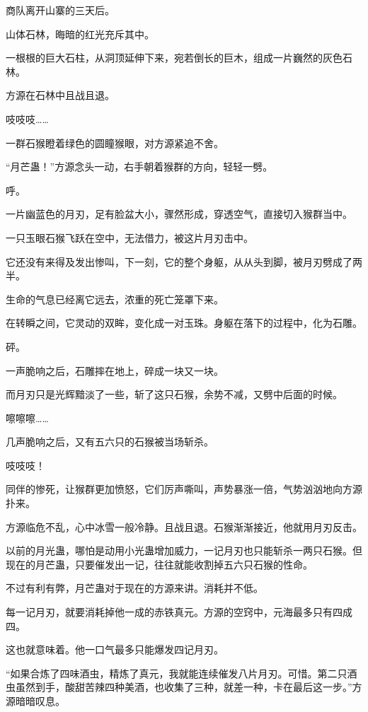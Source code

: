 
\begin{this_body}

商队离开山寨的三天后。

山体石林，晦暗的红光充斥其中。

一根根的巨大石柱，从洞顶延伸下来，宛若倒长的巨木，组成一片巍然的灰色石林。

方源在石林中且战且退。

吱吱吱……

一群石猴瞪着绿色的圆瞳猴眼，对方源紧追不舍。

“月芒蛊！”方源念头一动，右手朝着猴群的方向，轻轻一劈。

呼。

一片幽蓝色的月刃，足有脸盆大小，骤然形成，穿透空气，直接切入猴群当中。

一只玉眼石猴飞跃在空中，无法借力，被这片月刃击中。

它还没有来得及发出惨叫，下一刻，它的整个身躯，从从头到脚，被月刃劈成了两半。

生命的气息已经离它远去，浓重的死亡笼罩下来。

在转瞬之间，它灵动的双眸，变化成一对玉珠。身躯在落下的过程中，化为石雕。

砰。

一声脆响之后，石雕摔在地上，碎成一块又一块。

而月刃只是光辉黯淡了一些，斩了这只石猴，余势不减，又劈中后面的时候。

嚓嚓嚓……

几声脆响之后，又有五六只的石猴被当场斩杀。

吱吱吱！

同伴的惨死，让猴群更加愤怒，它们厉声嘶叫，声势暴涨一倍，气势汹汹地向方源扑来。

方源临危不乱，心中冰雪一般冷静。且战且退。石猴渐渐接近，他就用月刃反击。

以前的月光蛊，哪怕是动用小光蛊增加威力，一记月刃也只能斩杀一两只石猴。但现在的月芒蛊，只要催发出一记，往往就能收割掉五六只石猴的性命。

不过有利有弊，月芒蛊对于现在的方源来讲。消耗并不低。

每一记月刃，就要消耗掉他一成的赤铁真元。方源的空窍中，元海最多只有四成四。

这也就意味着。他一口气最多只能爆发四记月刃。

“如果合炼了四味酒虫，精炼了真元，我就能连续催发八片月刃。可惜。第二只酒虫虽然到手，酸甜苦辣四种美酒，也收集了三种，就差一种，卡在最后这一步。”方源暗暗叹息。


\end{this_body}
